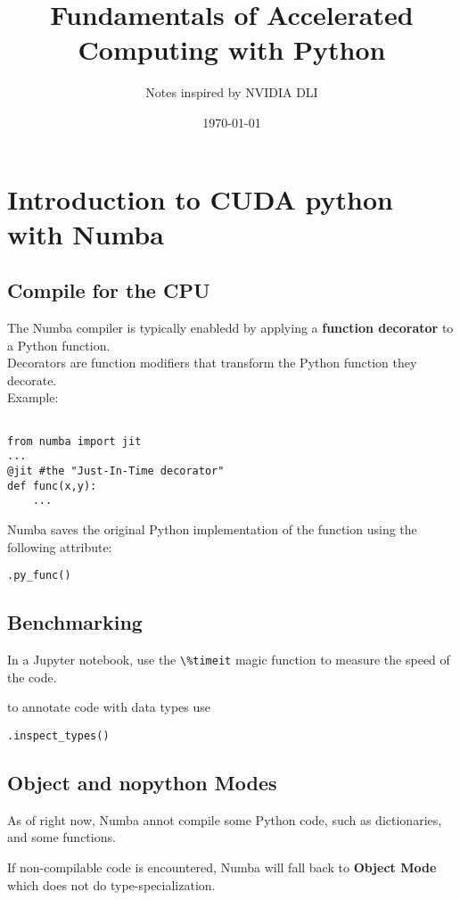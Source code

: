 \documentclass{article}
\title{Fundamentals of Accelerated Computing with Python}
\author{Notes inspired by NVIDIA DLI}
\date{\today}
\begin{document}
\maketitle

\section{Introduction to CUDA python with Numba}
\subsection{Compile for the CPU}
The Numba compiler is typically enabledd by applying a \textbf{function decorator} to a Python function. \\

Decorators are function modifiers that transform the Python function they decorate. \\
Example: 

\begin{verbatim}

from numba import jit
...
@jit #the "Just-In-Time decorator"
def func(x,y):
	...
\end{verbatim}

Numba saves the original Python implementation of the function using the following attribute:

\begin{verbatim}
.py_func()
\end{verbatim}

\subsection{Benchmarking}
In a Jupyter notebook, use the \verb_\%timeit_ magic function to measure the speed of the code.

to annotate code with data types use

\begin{verbatim}
.inspect_types()
\end{verbatim}

\subsection{Object and nopython Modes}
As of right now, Numba annot compile some Python code, such as dictionaries, and some functions.

If non-compilable code is encountered, Numba will fall back to \textbf{Object Mode} which does not do type-specialization.
\end{document}
